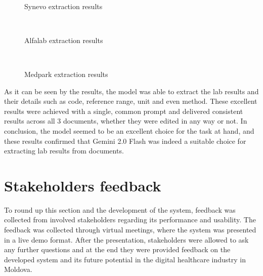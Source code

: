 \begin{figure}[ht]
    \centering
    \\[\baselineskip]
    \caption{Synevo extraction results}\label{fig:synevo}
\end{figure}

\begin{figure}[ht]
    \centering
    \\[\baselineskip]
    \caption{Alfalab extraction results}\label{fig:alfalab}
\end{figure}

\begin{figure}[ht]
    \centering
    \\[\baselineskip]
    \caption{Medpark extraction results}\label{fig:medpark}
\end{figure}

\FloatBarrier{}

As it can be seen by the results, the model was able to extract the lab results and their details such as code, reference range, unit and even method. These excellent results were achieved with a single, common prompt and delivered consistent results across all 3 documents, whether they were edited in any way or not. In conclusion, the model seemed to be an excellent choice for the task at hand, and these results confirmed that Gemini 2.0 Flash was indeed a suitable choice for extracting lab results from documents.

\section{Stakeholders feedback}

To round up this section and the development of the system, feedback was collected from involved stakeholders regarding its performance and usability. The feedback was collected through virtual meetings, where the system was presented in a live demo format. After the presentation, stakeholders were allowed to ask any further questions and at the end they were  provided feedback on the developed system and its future potential in the digital healthcare industry in Moldova.

